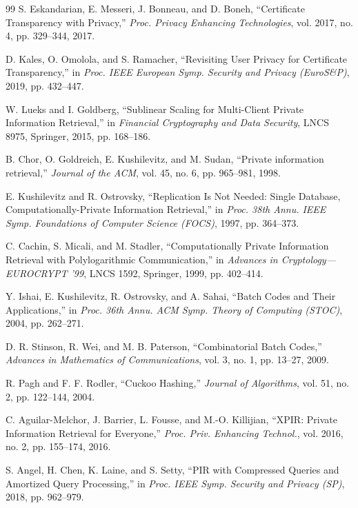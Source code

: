 \begin{thebibliography}{99}
S. Eskandarian, E. Messeri, J. Bonneau, and D. Boneh,
\newblock ``Certificate Transparency with Privacy,''
\newblock \emph{Proc. Privacy Enhancing Technologies}, vol. 2017, no. 4, pp. 329--344, 2017.

D. Kales, O. Omolola, and S. Ramacher,
\newblock ``Revisiting User Privacy for Certificate Transparency,''
\newblock in \emph{Proc. IEEE European Symp. Security and Privacy (EuroS\&P)}, 2019, pp. 432--447.

W. Lueks and I. Goldberg,
\newblock ``Sublinear Scaling for Multi-Client Private Information Retrieval,''
\newblock in \emph{Financial Cryptography and Data Security}, LNCS 8975, Springer, 2015, pp. 168--186.

B. Chor, O. Goldreich, E. Kushilevitz, and M. Sudan,
\newblock ``Private information retrieval,''
\newblock \emph{Journal of the ACM}, vol. 45, no. 6, pp. 965--981, 1998.

E. Kushilevitz and R. Ostrovsky,
\newblock ``Replication Is Not Needed: Single Database, Computationally-Private Information Retrieval,''
\newblock in \emph{Proc. 38th Annu. IEEE Symp. Foundations of Computer Science (FOCS)}, 1997, pp. 364--373.

C. Cachin, S. Micali, and M. Stadler,
\newblock ``Computationally Private Information Retrieval with Polylogarithmic Communication,''
\newblock in \emph{Advances in Cryptology---EUROCRYPT '99}, LNCS 1592, Springer, 1999, pp. 402--414.

Y. Ishai, E. Kushilevitz, R. Ostrovsky, and A. Sahai,
\newblock ``Batch Codes and Their Applications,''
\newblock in \emph{Proc. 36th Annu. ACM Symp. Theory of Computing (STOC)}, 2004, pp. 262--271.

D. R. Stinson, R. Wei, and M. B. Paterson,
\newblock ``Combinatorial Batch Codes,''
\newblock \emph{Advances in Mathematics of Communications}, vol. 3, no. 1, pp. 13--27, 2009.

R. Pagh and F. F. Rodler,
\newblock ``Cuckoo Hashing,''
\newblock \emph{Journal of Algorithms}, vol. 51, no. 2, pp. 122--144, 2004.

C. Aguilar-Melchor, J. Barrier, L. Fousse, and M.-O. Killijian,
\newblock ``XPIR: Private Information Retrieval for Everyone,''
\newblock \emph{Proc. Priv. Enhancing Technol.}, vol. 2016, no. 2, pp. 155--174, 2016.

S. Angel, H. Chen, K. Laine, and S. Setty,
\newblock ``PIR with Compressed Queries and Amortized Query Processing,''
\newblock in \emph{Proc. IEEE Symp. Security and Privacy (SP)}, 2018, pp. 962--979.


\end{thebibliography}
